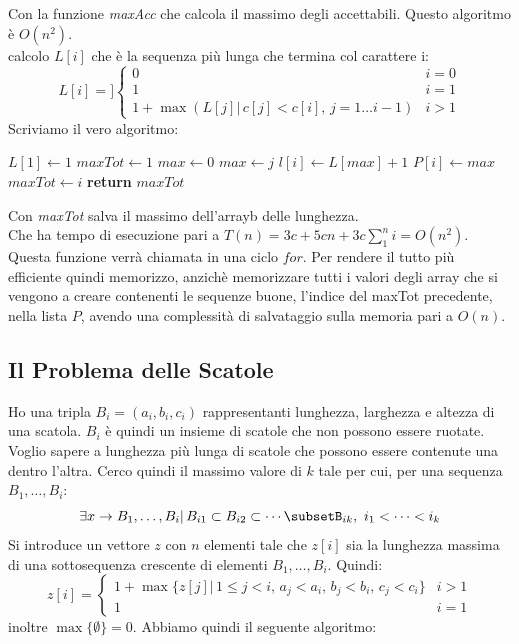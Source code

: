 \documentclass[a4paper,12pt, oneside]{book}
\begin{document}
Con la funzione \textit{maxAcc} che calcola il massimo degli
accettabili. Questo algoritmo è $O(n^2)$.\\
calcolo $L[i]$ che è la sequenza più lunga che termina col carattere i:
\[
  L[i]=]\begin{cases}
    0 & i=0\\
    1 & i=1\\
    1+\max(L[j]|\, c[j]<c[i],\, j=1\ldots i-1)  & i>1 
  \end{cases}
\]
Scriviamo il vero algoritmo:
\begin{shaded}
  \begin{algorithmic}
    \State $L[1]\gets1$
    \State $maxTot \gets 1$
    \State $max \gets 0$
    \State $max \gets j$
    \EndIf
    \State $l[i]\gets L[max]+1$
    \State $P[i]\gets max$ 
    \State $maxTot \gets i$
    \EndIf
    \EndFor
    \EndFor
    \State \textbf{return} $maxTot$
    \EndFunction
  \end{algorithmic}
\end{shaded}
Con \textit{maxTot} salva il massimo dell'arrayb delle lunghezza.\\
Che ha tempo di esecuzione pari a $T(n)=3c+5cn+3c\sum_1^ni=O(n^2)$.\\
Questa funzione verrà chiamata in una ciclo $for$. Per rendere il
tutto più efficiente quindi memorizzo, anzichè memorizzare tutti i
valori degli array che si vengono a creare contenenti le sequenze
buone, l'indice del maxTot precedente, nella lista $P$, avendo una
complessità di salvataggio sulla memoria pari a $O(n)$.\\
\subsection{Il Problema delle Scatole}
Ho una tripla $B_i=(a_i,b_i,c_i)$ rappresentanti lunghezza, larghezza
e altezza di una scatola. $B_i$ è quindi un insieme di scatole che non
possono essere ruotate. Voglio sapere a lunghezza più lunga di scatole
che possono essere contenute una dentro l’altra. Cerco quindi il
massimo valore di $k$ tale per cui, per una sequenza $ B_1,\ldots,B_i$:
\[\exists x\to B_1,\ldots,B_i|\,B_{i1}\subset B_{i2}\subset\cdots
  \subsetB_{ik},\,\,i_1<\cdots<i_k\]
Si introduce un vettore $z$ con $n$ elementi tale che $z[i]$ sia la
lunghezza massima di una sottosequenza crescente di elementi $
B_1,\ldots,B_i$. Quindi:
\[
  z[i]=\begin{cases}
    1+\max\{z[j]|\, 1\leq j < i,\,a_j<a_i,\,b_j<b_i,\,c_j<c_i\} &
    i>1\\
    1 & i = 1
  \end{cases}
\]
inoltre $\max\{\emptyset\}=0$. Abbiamo quindi il seguente algoritmo:
\end{document}
